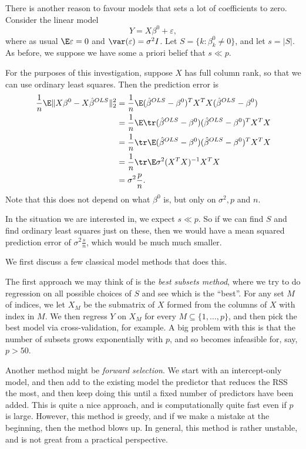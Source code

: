 \documentclass[a4paper]{article}
\begin{document}
There is another reason to favour models that sets a lot of coefficients to zero. Consider the linear model
\[
  Y = X \beta^0 + \varepsilon,
\]
where as usual $\E \varepsilon = 0$ and $\var(\varepsilon) = \sigma^2 I$. Let $S = \{k : \beta^0_k \not= 0\}$, and let $s = |S|$. As before, we suppose we have some a priori belief that $s \ll p$.

For the purposes of this investigation, suppose $X$ has full column rank, so that we can use ordinary least squares. Then the prediction error is
\begin{align*}
  \frac{1}{n} \E \|X \beta^0 - X \hat{\beta}^{OLS} \|_2^2 &= \frac{1}{n} \E (\hat{\beta}^{OLS} - \beta^0)^T X^T X (\hat{\beta}^{OLS} - \beta^0)\\
  &= \frac{1}{n} \E \tr (\hat{\beta}^{OLS} - \beta^0) (\hat{\beta}^{OLS} - \beta^0)^T X^T X\\
  &= \frac{1}{n} \tr \E(\hat{\beta}^{OLS} - \beta^0) (\hat{\beta}^{OLS} - \beta^0)^T X^T X\\
  &= \frac{1}{n} \tr \E \sigma^2 (X^T X)^{-1} X^T X\\
  &= \sigma^2 \frac{p}{n}.
\end{align*}
Note that this does not depend on what $\beta^0$ is, but only on $\sigma^2, p$ and $n$.

In the situation we are interested in, we expect $s \ll p$. So if we can find $S$ and find ordinary least squares just on these, then we would have a mean squared prediction error of $\sigma^2 \frac{s}{n}$, which would be much much smaller.

We first discuss a few classical model methods that does this.

The first approach we may think of is the \emph{best subsets method}, where we try to do regression on all possible choices of $S$ and see which is the ``best''. For any set $M$ of indices, we let $X_M$ be the submatrix of $X$ formed from the columns of $X$ with index in $M$. We then regress $Y$ on $X_M$ for every $M \subseteq \{1, \ldots, p\}$, and then pick the best model via cross-validation, for example. A big problem with this is that the number of subsets grows exponentially with $p$, and so becomes infeasible for, say, $p > 50$.

Another method might be \emph{forward selection}. We start with an intercept-only model, and then add to the existing model the predictor that reduces the RSS the most, and then keep doing this until a fixed number of predictors have been added. This is quite a nice approach, and is computationally quite fast even if $p$ is large. However, this method is greedy, and if we make a mistake at the beginning, then the method blows up. In general, this method is rather unstable, and is not great from a practical perspective.
\end{document}
